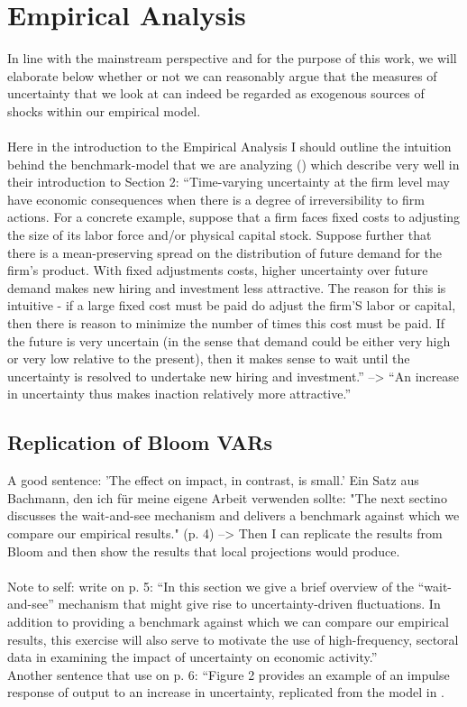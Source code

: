 \documentclass[a4paper,12pt,oneside,pointednumbers,bibtotoc,bigheadings,liststotoc]{scrbook}
\begin{document}
\chapter{Empirical Analysis}
\label{sec:EmpiricalAnalysis}
In line with the mainstream perspective and for the purpose of this work, we will elaborate below whether or not we can reasonably argue that the measures of uncertainty that we look at can indeed be regarded as exogenous sources of shocks within our empirical model. \\
\\
Here in the introduction to the Empirical Analysis I should outline the intuition behind the benchmark-model that we are analyzing (\citet{bloom:09}) which \citet{bachmannetal:13} describe very well in their introduction to Section 2: ``Time-varying uncertainty at the firm level may have economic consequences when there is a degree of irreversibility to firm actions. For a concrete example, suppose that a firm faces fixed costs to adjusting the size of its labor force and/or physical capital stock. Suppose further that there is a mean-preserving spread on the distribution of future demand for the firm's product. With fixed adjustments costs, higher uncertainty over future demand makes new hiring and investment less attractive. The reason for this is intuitive - if a large fixed cost must be paid do adjust the firm'S labor or capital, then there is reason to minimize the number of times this cost must be paid. If the future is very uncertain (in the sense that demand could be either very high or very low relative to the present), then it makes sense to wait until the uncertainty is resolved to undertake new hiring and investment.'' --> ``An increase in uncertainty thus makes inaction relatively more attractive.'' 



\section{Replication of Bloom VARs}
A good sentence: 'The effect on impact, in contrast, is small.' 
Ein Satz aus Bachmann, den ich für meine eigene Arbeit verwenden sollte: "The next sectino discusses the wait-and-see mechanism and delivers a benchmark against which we compare our empirical results." (p. 4) --> Then I can replicate the results from Bloom and then show the results that local projections would produce.\\
\\
Note to self: \citet{bachmannetal:13} write on p. 5: ``In this section we give a brief overview of the ``wait-and-see'' mechanism that might give rise to uncertainty-driven fluctuations. In addition to providing a benchmark against which we can compare our empirical results, this exercise will also serve to motivate the use of high-frequency, sectoral data in examining the impact of uncertainty on economic activity.''\\
Another sentence that \citet{bachmannetal:13} use on p. 6: ``Figure 2 provides an example of an impulse response of output to an increase in uncertainty, replicated from the model in \citet{bloom:09}.
\end{document}
